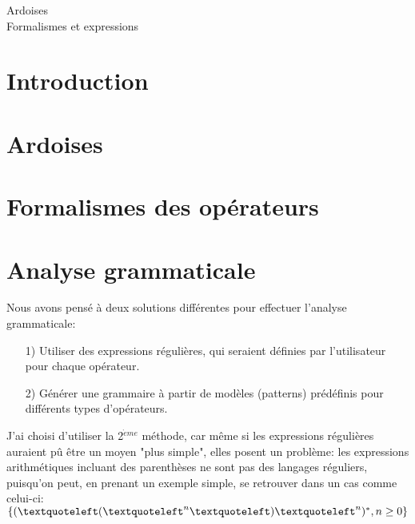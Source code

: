 \documentclass{article}
\begin{document}
\begin{center}
	\huge 
	Ardoises \\
	Formalismes et expressions
\end{center}
\renewcommand{\contentsname}{Sommaire}
\tableofcontents
\newpage

\section{Introduction}
\section{Ardoises}
\section{Formalismes des opérateurs}
\section{Analyse grammaticale}
Nous avons pensé à deux solutions différentes pour effectuer l'analyse grammaticale:
\begin{enumerate}
	\item[1)] Utiliser des expressions régulières, qui seraient définies par l'utilisateur pour chaque opérateur.
	\item[2)] Générer une grammaire à partir de modèles (patterns) prédéfinis pour différents types d'opérateurs.
\end{enumerate}
J'ai choisi d'utiliser la 2$^{\grave{e}me}$ méthode, car même si les expressions régulières auraient pû être un moyen "plus simple", elles posent un problème: les expressions arithmétiques incluant des parenthèses ne sont pas des langages réguliers, puisqu'on peut, en prenant un exemple simple, se retrouver dans un cas comme celui-ci: $\{(\textquoteleft(\textquoteleft^{n}\textquoteleft)\textquoteleft^{n})^{*}, n \ge 0 \}$
\end{document}
